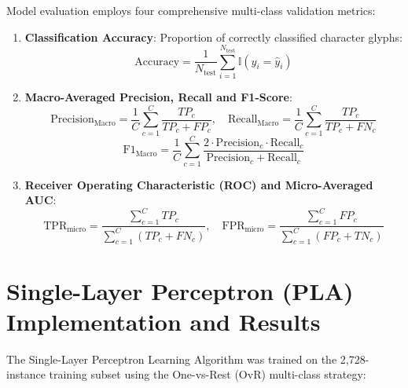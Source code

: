 \documentclass[12pt,a4paper]{article}
\begin{document}
Model evaluation employs four comprehensive multi-class validation metrics:
\begin{enumerate}
\item \textbf{Classification Accuracy}: Proportion of correctly classified character glyphs:
\begin{equation}
\text{Accuracy} = \frac{1}{N_{\text{test}}} \sum_{i=1}^{N_{\text{test}}} \mathbb{I}(y_i = \hat{y}_i)
\end{equation}
\item \textbf{Macro-Averaged Precision, Recall and F1-Score}:
\begin{equation}
\text{Precision}_{\text{Macro}} = \frac{1}{C} \sum_{c=1}^C \frac{TP_c}{TP_c + FP_c}, \quad \text{Recall}_{\text{Macro}} = \frac{1}{C} \sum_{c=1}^C \frac{TP_c}{TP_c + FN_c}
\end{equation}
\begin{equation}
\text{F1}_{\text{Macro}} = \frac{1}{C} \sum_{c=1}^C \frac{2 \cdot \text{Precision}_c \cdot \text{Recall}_c}{\text{Precision}_c + \text{Recall}_c}
\end{equation}
\item \textbf{Receiver Operating Characteristic (ROC) and Micro-Averaged AUC}:
\begin{equation}
\text{TPR}_{\text{micro}} = \frac{\sum_{c=1}^C TP_c}{\sum_{c=1}^C (TP_c + FN_c)}, \quad \text{FPR}_{\text{micro}} = \frac{\sum_{c=1}^C FP_c}{\sum_{c=1}^C (FP_c + TN_c)}
\end{equation}
\end{enumerate}

\section{Single-Layer Perceptron (PLA) Implementation and Results}

The Single-Layer Perceptron Learning Algorithm was trained on the 2,728-instance training subset using the One-vs-Rest (OvR) multi-class strategy:

\begin{table}[H]
\centering
{}
\caption{Single-Layer Perceptron (PLA) Multi-Class Performance Summary}
\label{tab:exp9_pla_summary}
\end{table}
\end{document}
